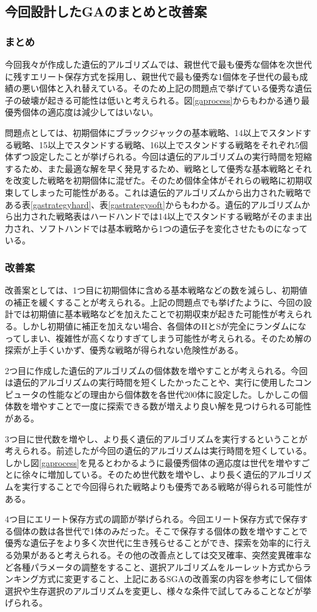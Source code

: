 \subsection{今回設計したGAのまとめと改善案}
\subsubsection{まとめ}
今回我々が作成した遺伝的アルゴリズムでは、親世代で最も優秀な個体を次世代に残すエリート保存方式を採用し、親世代で最も優秀な1個体を子世代の最も成績の悪い個体と入れ替えている。そのため上記の問題点で挙げている優秀な遺伝子の破壊が起きる可能性は低いと考えられる。図\ref{gaprocess}からもわかる通り最優秀個体の適応度は減少してはいない。

問題点としては、初期個体にブラックジャックの基本戦略、14以上でスタンドする戦略、15以上でスタンドする戦略、16以上でスタンドする戦略をそれぞれ5個体ずつ設定したことが挙げられる。今回は遺伝的アルゴリズムの実行時間を短縮するため、また最適な解を早く発見するため、戦略として優秀な基本戦略とそれを改変した戦略を初期個体に混ぜた。そのため個体全体がそれらの戦略に初期収束してしまった可能性がある。これは遺伝的アルゴリズムから出力された戦略である表\ref{gastrategyhard}、表\ref{gastrategysoft}からもわかる。遺伝的アルゴリズムから出力された戦略表はハードハンドでは14以上でスタンドする戦略がそのまま出力され、ソフトハンドでは基本戦略から1つの遺伝子を変化させたものになっている。

\subsubsection{改善案}
改善案としては、1つ目に初期個体に含める基本戦略などの数を減らし、初期値の補正を緩くすることが考えられる。上記の問題点でも挙げたように、今回の設計では初期値に基本戦略などを加えたことで初期収束が起きた可能性が考えられる。しかし初期値に補正を加えない場合、各個体のHとSが完全にランダムになってしまい、複雑性が高くなりすぎてしまう可能性が考えられる。そのため解の探索が上手くいかず、優秀な戦略が得られない危険性がある。

2つ目に作成した遺伝的アルゴリズムの個体数を増やすことが考えられる。今回は遺伝的アルゴリズムの実行時間を短くしたかったことや、実行に使用したコンピュータの性能などの理由から個体数を各世代200体に設定した。しかしこの個体数を増やすことで一度に探索できる数が増えより良い解を見つけられる可能性がある。

3つ目に世代数を増やし、より長く遺伝的アルゴリズムを実行するということが考えられる。前述したが今回の遺伝的アルゴリズムは実行時間を短くしている。しかし図\ref{gaprocess}を見るとわかるように最優秀個体の適応度は世代を増やすごとに徐々に増加している。そのため世代数を増やし、より長く遺伝的アルゴリズムを実行することで今回得られた戦略よりも優秀である戦略が得られる可能性がある。

4つ目にエリート保存方式の調節が挙げられる。今回エリート保存方式で保存する個体の数は各世代で1体のみだった。そこで保存する個体の数を増やすことで優秀な遺伝子をより多く次世代に生き残らせることができ、探索を効率的に行える効果があると考えられる。その他の改善点としては交叉確率、突然変異確率など各種パラメータの調整をすること、選択アルゴリズムをルーレット方式からランキング方式に変更すること、上記にあるSGAの改善案の内容を参考にして個体選択や生存選択のアルゴリズムを変更し、様々な条件で試してみることなどが挙げられる。
